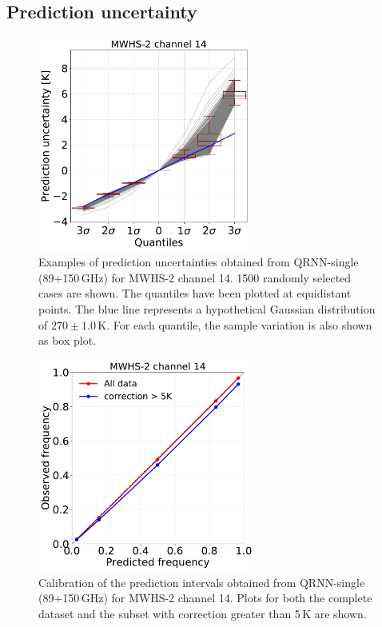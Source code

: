 \documentclass[amt, manuscript]{copernicus}
\begin{document}
\subsection{Prediction uncertainty}
\label{sec:uncertainty_mwhs}
\begin{figure}[t]
	\includegraphics[width = 70mm]{Figures/prediction_uncertainty_MWHS_14.pdf}	
	\caption{Examples of prediction uncertainties obtained from QRNN-single (89+150\,GHz) for MWHS-2 channel 14. 1500 randomly selected cases are shown. The quantiles have been plotted at equidistant points. The blue line represents a hypothetical Gaussian distribution of $270\pm1.0$\,K. For each quantile, the sample variation is also shown as box plot. }
	\label{fig:prediction_uncertainty_mwhs}	
\end{figure}
\begin{figure}[t]
	\includegraphics[height = 70mm]{Figures/calibration_QRNN_MWHS_14.pdf}	
	\caption{Calibration of the prediction intervals obtained from QRNN-single (89+150\,GHz) for MWHS-2 channel 14. Plots for both the complete dataset and the subset with correction greater than 5\,K are shown. }
	\label{fig:calibration_mwhs}	
\end{figure}
\end{document}
